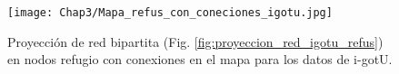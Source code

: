 \begin{figure}[ht]
    \begin{center}
        \texttt{[image: Chap3/Mapa\_refus\_con\_coneciones\_igotu.jpg]}
        \caption[Proyección en nodos refugio con conexiones en el mapa.]{Proyección de red bipartita (Fig. \ref{fig:proyeccion_red_igotu_refus}) en nodos refugio con conexiones en el mapa para los datos de i-gotU. }
        \label{fig:mapa_con_conexiones_igotu}
       
        \end{center}
\end{figure}
 
 
 
 
 
 
 
 
 

